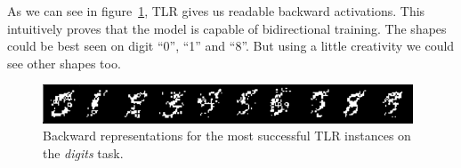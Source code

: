 As we can see in figure~\ref{fig:results-tlr-digits-backward}, TLR gives us readable backward activations. This intuitively proves that the model is capable of bidirectional training. The shapes could be best seen on digit ``0'', ``1'' and ``8''. But using a little creativity we could see other shapes too. 

\begin{figure}[H]
  \centering
  \includegraphics[width=0.98\textwidth]{img/tlr-digits.png}    
  \caption{Backward representations for the most successful TLR instances on the \emph{digits} task.}
  \label{fig:results-tlr-digits-backward} 
\end{figure}
